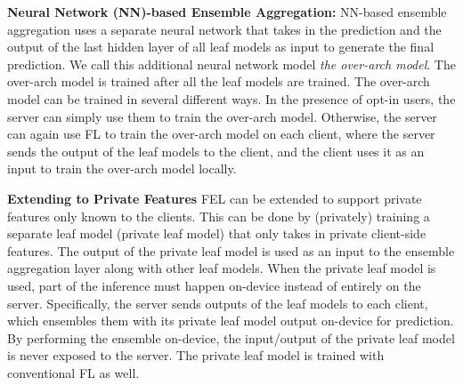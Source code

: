 \documentclass{article}
\newcommand{\il}[1]{\sethlcolor{yellow}\hl{[Ilias: #1]}}
\begin{document}
{\bf Neural Network (NN)-based Ensemble Aggregation:}
NN-based ensemble aggregation uses a separate neural network that takes in the prediction and the output of the last hidden layer of all leaf models as input to generate the final prediction.
We call this additional neural network model \textit{the over-arch model}.
The over-arch model is trained after all the leaf models are trained. The over-arch model can be trained in several different ways. In the presence of opt-in users, the server can simply use them to train the over-arch model. Otherwise, the server can again use FL to train the over-arch model on each client, where the server sends the output of the leaf models to the client, and the client uses it as an input to train the over-arch model locally.


{\bf Extending to Private Features}
%
FEL can be extended to support private features only known to the clients. This can be done by (privately) training a separate leaf model (private leaf model) that only takes in private client-side features. The output of the private leaf model is used as an input to the ensemble aggregation layer along with other leaf models.
%
When the private leaf model is used, part of the inference must happen on-device instead of entirely on the server. Specifically, the server sends outputs of the leaf models to each client, which ensembles them with its private leaf model output on-device for prediction. By performing the ensemble on-device, the input/output of the private leaf model is never exposed to the server. The private leaf model is trained with conventional FL as well.
\end{document}
